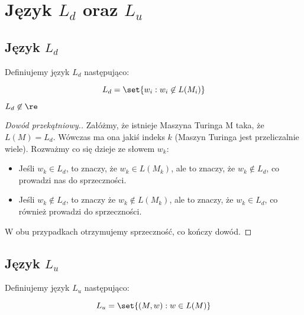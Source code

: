 \section{Język \texorpdfstring{\( L_d \)}{Ld} oraz \texorpdfstring{\(L_u\)}{Lu}}

\subsection{Język \texorpdfstring{\( L_d \)}{Ld}} 

\begin{definition} 
    Definiujemy język \(L_d\) następująco: 
    
    \[ 
        L_d = \set{w_i : w_i \not \in L(M_i)}
    \]
\end{definition}

\begin{theorem}
    \( L_d \not \in \re \)
\end{theorem}
\begin{proof}[Dowód przekątniowy.]
    Załóżmy, że istnieje Maszyna Turinga M taka, że \(L(M) = L_d\). Wówczas ma ona jakiś indeks \(k\) (Maszyn Turinga jest przeliczalnie wiele). Rozważmy co się dzieje ze słowem \(w_k\):
    
    \begin{itemize}
        \item Jeśli \(w_k \in L_d\), to znaczy, że \(w_k \in L(M_k)\), ale to znaczy, że \(w_k \not \in L_d\), co prowadzi nas do sprzeczności.
        
        \item Jeśli \(w_k \not\in L_d\), to znaczy że \(w_k \not\in L(M_k)\), ale to znaczy, że \(w_k \in L_d\), co również prowadzi do sprzeczności.
    \end{itemize}
    
    W obu przypadkach otrzymujemy sprzeczność, co kończy dowód. 
\end{proof}
    
\subsection{Język \texorpdfstring{\(L_u\)}{Lu}} 

\begin{definition}
    Definiujemy język \(L_u\) następująco:
    
    \[ 
        L_u = \set{ (M, w) : w \in L(M)}
    \]
    
\end{definition}
    
